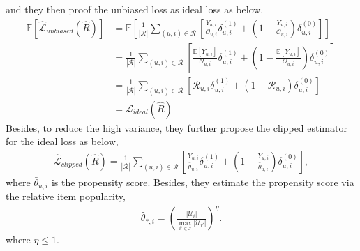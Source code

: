 \documentclass[sigconf]{acmart}
\begin{document}
and they then proof the unbiased loss as ideal loss as below. 
\begin{equation}\label{eq:proofloss}
	\begin{aligned}
		\mathbb{E} \left[\hat{\mathcal{L}}_{unbiased}(\hat{R})\right] & = \mathbb{E} \left[\frac{1}{|\mathcal{R}|} \sum_{(u, i) \in \mathcal{R}}^{} \left[\frac{Y_{u,i}}{\mathcal{O}_{u,i}} \delta_{u, i}^{(1)} +\left(1 - \frac{Y_{u,i}}{\mathcal{O}_{u,i}}\right)\delta_{u, i}^{(0)} \right]\right]  \\
		& = \frac{1}{|\mathcal{R}|} \sum_{(u, i) \in \mathcal{R}}^{} \left[\frac{\mathbb{E} \left[Y_{u,i}\right]}{\mathcal{O}_{u,i}} \delta_{u, i}^{(1)} +\left(1 - \frac{\mathbb{E} \left[Y_{u,i}\right]}{\mathcal{O}_{u,i}}\right)\delta_{u, i}^{(0)} \right] \\
		& = \frac{1}{|\mathcal{R}|} \sum_{(u, i) \in \mathcal{R}}^{} \left[\mathcal{R}_{u,i} \delta_{u, i}^{(1)} +\left(1 - \mathcal{R}_{u,i}\right)\delta_{u, i}^{(0)} \right] \\
		& = \mathcal{L}_{ideal}(\hat{R})
	\end{aligned}
\end{equation}
Besides, to reduce the high variance, they further propose the clipped estimator for the ideal loss as below,
\begin{eqnarray}\label{eq:clipped}
	\hat{\mathcal{L}}_{clipped}(\hat{R}) = \frac{1}{|\mathcal{R}|} \sum_{(u, i) \in \mathcal{R}}^{} \left[\frac{Y_{u,i}}{\bar{\theta}_{u,i}} \delta_{u, i}^{(1)} +\left(1 - \frac{Y_{u,i}}{\bar{\theta}_{u,i}}\right)\delta_{u, i}^{(0)} \right] ,
\end{eqnarray}
where $\bar{\theta}_{u,i}$ is the propensity score. Besides, they estimate the propensity score via the relative item popularity,
\begin{eqnarray}\label{eq:itempop}
	\hat{\theta}_{*,i} = \left(\frac{|\mathcal{U}_i|}{\max_{i' \in \mathcal{I}} |\mathcal{U}_{i'}|}\right)^{\eta} .
\end{eqnarray}
where $\eta \leq 1$.
\end{document}
